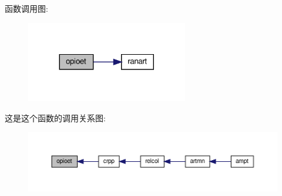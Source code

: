 函数调用图\+:
\nopagebreak
\begin{figure}[H]
\begin{center}
\leavevmode
\includegraphics[width=200pt]{opioet_8f90_aae72d2f9bafd8f19c95ee9beba68a69c_cgraph}
\end{center}
\end{figure}
这是这个函数的调用关系图\+:
\nopagebreak
\begin{figure}[H]
\begin{center}
\leavevmode
\includegraphics[width=350pt]{opioet_8f90_aae72d2f9bafd8f19c95ee9beba68a69c_icgraph}
\end{center}
\end{figure}
